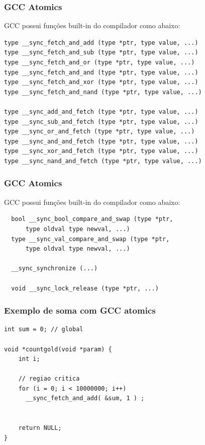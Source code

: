 \documentclass[xcolor=dvipsnames,11pt,presentation,aspectratio=169]{beamer}
\begin{document}
\begin{frame}[fragile]
  \frametitle{GCC Atomics}
GCC possui funções built-in do compilador como abaixo:
\begin{lstlisting}
type __sync_fetch_and_add (type *ptr, type value, ...)
type __sync_fetch_and_sub (type *ptr, type value, ...)
type __sync_fetch_and_or (type *ptr, type value, ...)
type __sync_fetch_and_and (type *ptr, type value, ...)
type __sync_fetch_and_xor (type *ptr, type value, ...)
type __sync_fetch_and_nand (type *ptr, type value, ...)

type __sync_add_and_fetch (type *ptr, type value, ...)
type __sync_sub_and_fetch (type *ptr, type value, ...)
type __sync_or_and_fetch (type *ptr, type value, ...)
type __sync_and_and_fetch (type *ptr, type value, ...)
type __sync_xor_and_fetch (type *ptr, type value, ...)
type __sync_nand_and_fetch (type *ptr, type value, ...)
\end{lstlisting}
\end{frame}
\begin{frame}[fragile]
  \frametitle{GCC Atomics}
GCC possui funções built-in do compilador como abaixo:
\begin{lstlisting}
  bool __sync_bool_compare_and_swap (type *ptr,
      type oldval type newval, ...)
  type __sync_val_compare_and_swap (type *ptr,
      type oldval type newval, ...)

  __sync_synchronize (...)

  void __sync_lock_release (type *ptr, ...)
\end{lstlisting}
\end{frame}
\begin{frame}[fragile]
  \frametitle{Exemplo de soma com GCC atomics}
\begin{lstlisting}
int sum = 0; // global

void *countgold(void *param) {
    int i;

    // regiao critica
    for (i = 0; i < 10000000; i++)
      __sync_fetch_and_add( &sum, 1 ) ;
  

    return NULL;
}
\end{lstlisting}
\end{frame}
\end{document}
